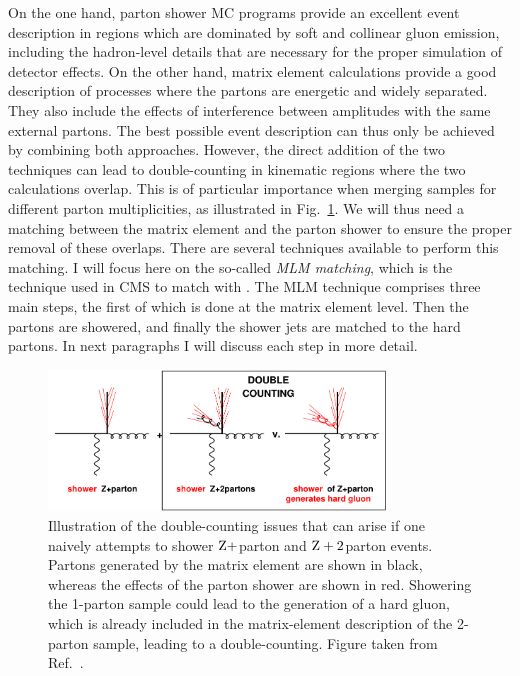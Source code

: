 On the one hand, parton shower MC programs provide an excellent event description in regions which
are dominated by soft and collinear gluon emission, including the hadron-level details that are
necessary for the proper simulation of detector effects. 
On the other hand, matrix element calculations provide a good description of processes where
the partons are energetic and widely separated. They also include the effects of
interference between amplitudes with the same external partons. 
The best possible event description can thus only be achieved by combining both approaches.
However, the direct addition of the two techniques can lead to double-counting in kinematic regions
where the two calculations overlap. This is of particular importance when merging samples for
different parton multiplicities, as illustrated in Fig.~\ref{fig:overlap}.
We will thus need a matching between the matrix element
and the parton shower to ensure the proper removal of these overlaps.
There are several techniques available to perform this matching. I will focus here on the so-called
\textit{MLM matching}, which is the technique used in CMS to match \MADGRAPH with
\PYTHIA. The MLM technique comprises three main steps, the first of which is done at the
matrix element level. Then the partons are showered, and finally the shower jets are matched to the
hard partons. 
In next paragraphs I will discuss each step in more detail. 


\begin{figure}[t]
  \centering
  \includegraphics[width=0.8\textwidth]{figures/eventreco_generation/overlap}
  \caption{ Illustration of the double-counting issues that can arise if one naively attempts to
shower $\mathrm{Z}+$parton and $\mathrm{Z}+2$parton events. Partons generated by the matrix element are
shown in black, whereas the effects of the parton shower are shown in red. Showering the 1-parton
sample could lead to the generation of a hard gluon, which is already included in the matrix-element
description of the 2-parton sample, leading to a double-counting. Figure taken from
Ref.~\cite{Salam:2010zt}. 
  \label{fig:overlap}}
\end{figure}


